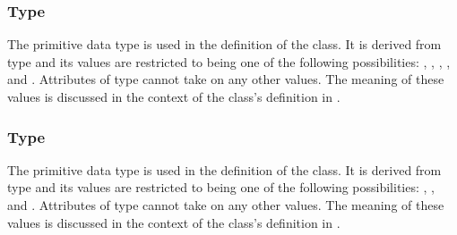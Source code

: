 \subsubsection{Type \fixttspace{}}
\label{primtype-BoundaryConditionKind}

The  primitive data type is used in the definition of the \BoundaryCondition class.  It is derived from type  and its values are restricted to being one of the following possibilities: , , , , and .  Attributes of type  cannot take on any other values.  The meaning of these values is discussed in the context of the \BoundaryCondition class's definition in .


\subsubsection{Type \fixttspace{}}
\label{primtype-CoordinateKind}

The  primitive data type is used in the definition of the \CoordinateComponent class.  It is derived from type  and its values are restricted to being one of the following possibilities: , , and .
Attributes of type  cannot take on any other values.  The meaning of these values is discussed in the context of the \CoordinateComponent class's definition in .


%

